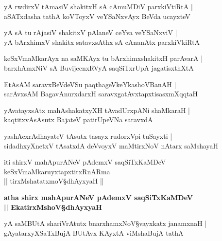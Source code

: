 \begin{shloka}
yA rwdirxV tAmasiV shakitxH sA cAmuMDiV parxkiVtiRtA |\\
aSATxdasha tathA koVToyxV veYSaNxvAyx BeVda ucayxteV 
\end{shloka}

\begin{shloka}
yA sA tu rAjasiV shakitxV pAlaneV ceYva veYSaNxviV |\\
yA bArxhimxV shakitx satavxsAthx sA cAnanAtx parxkiVkiRtA 
\end{shloka}

\begin{shloka}
keSxVmaMkarAyx na saMKAyx tu bArxhimxshakitxH parAvarA |\\
barxhAmxNiV sA BuvijecnxRVyA saqSiTxrUpA jagatisxthXtA 
\end{shloka}

\begin{shloka}
EtAsAM saravxBeVdeVSu paqthageVkeYkashoVBanAH |\\
sarAvxsAM BagavAnurxdarxH saravxgatAvxtapxtisasxmXqqtaH 
\end{shloka}

\begin{shloka}
yAvatayxsAtx mahAshakatxyXH tAvadUrxpANi shaMkaraH |\\
kaqtitxvAsAsutx BajateV patirUpeVNa saravxdA 
\end{shloka}

\begin{shloka}
yashAcxrAdhayateV tAsutx tasayx rudorxVpi tuSayxti |\\
sidadhxyXnetxV tAsatxdA deVvoyxV maMtirxNoV nAtarx saMshayaH 
\end{shloka}

\begin{center}
iti shirxV mahApurANeV pAdemxV saqSiTxKaMDeV keSxVmaMkaruyxtapxtitxRnARma\\ 
|| tirxMshatatxmoV\S dhAyxyaH ||
\end{center}

\bigskip
\begin{center}
\textbf{\large atha shirx mahApurANeV pAdemxV saqSiTxKaMDeV}\\
\textbf{\large || EkatirxMshoV\S dhAyxyaH}
\end{center}

\setcounter{shloka}{0}
\begin{shloka}
yA saMBUtA shariVrAtutx bnarxhamxNoV\S vayxkatx janamxnaH |\\
gAyatarxyXSaTxBujA BUtAvx KAyxtA viMshaBujA tathA
\end{shloka}

